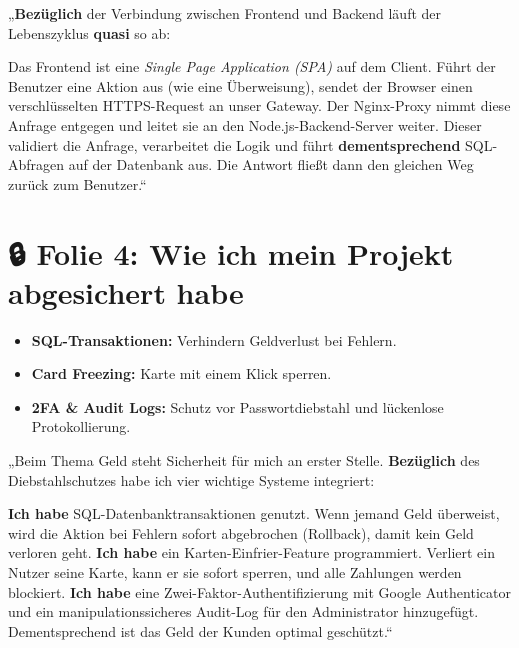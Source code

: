 \documentclass[11pt,a4paper]{article}
\begin{document}
\begin{tcolorbox}[colback=white, colframe=primarynavy, title=\textbf{Mein Sprechtext (Ich-Form)}]
„\textbf{Bezüglich} der Verbindung zwischen Frontend und Backend läuft der Lebenszyklus \textbf{quasi} so ab:

Das Frontend ist eine \textit{Single Page Application (SPA)} auf dem Client. Führt der Benutzer eine Aktion aus (wie eine Überweisung), sendet der Browser einen verschlüsselten HTTPS-Request an unser Gateway. Der Nginx-Proxy nimmt diese Anfrage entgegen und leitet sie an den Node.js-Backend-Server weiter. Dieser validiert die Anfrage, verarbeitet die Logik und führt \textbf{dementsprechend} SQL-Abfragen auf der Datenbank aus. Die Antwort fließt dann den gleichen Weg zurück zum Benutzer.“
\end{tcolorbox}

\newpage

\section{🔒 Folie 4: Wie ich mein Projekt abgesichert habe}

\begin{tcolorbox}[colback=bglight, colframe=slidered, title=\textbf{\color{white}Visualisierung auf Folie 4}, arc=4pt]
\begin{itemize}
    \item \textbf{SQL-Transaktionen:} Verhindern Geldverlust bei Fehlern.
    \item \textbf{Card Freezing:} Karte mit einem Klick sperren.
    \item \textbf{2FA \& Audit Logs:} Schutz vor Passwortdiebstahl und lückenlose Protokollierung.
\end{itemize}
\end{tcolorbox}

\begin{tcolorbox}[colback=white, colframe=primarynavy, title=\textbf{Mein Sprechtext (Ich-Form)}]
„Beim Thema Geld steht Sicherheit für mich an erster Stelle. \textbf{Bezüglich} des Diebstahlschutzes habe ich vier wichtige Systeme integriert:

\textbf{Ich habe} SQL-Datenbanktransaktionen genutzt. Wenn jemand Geld überweist, wird die Aktion bei Fehlern sofort abgebrochen (Rollback), damit kein Geld verloren geht.
\textbf{Ich habe} ein Karten-Einfrier-Feature programmiert. Verliert ein Nutzer seine Karte, kann er sie sofort sperren, und alle Zahlungen werden blockiert.
\textbf{Ich habe} eine Zwei-Faktor-Authentifizierung mit Google Authenticator und ein manipulationssicheres Audit-Log für den Administrator hinzugefügt. Dementsprechend ist das Geld der Kunden optimal geschützt.“
\end{tcolorbox}
\end{document}
